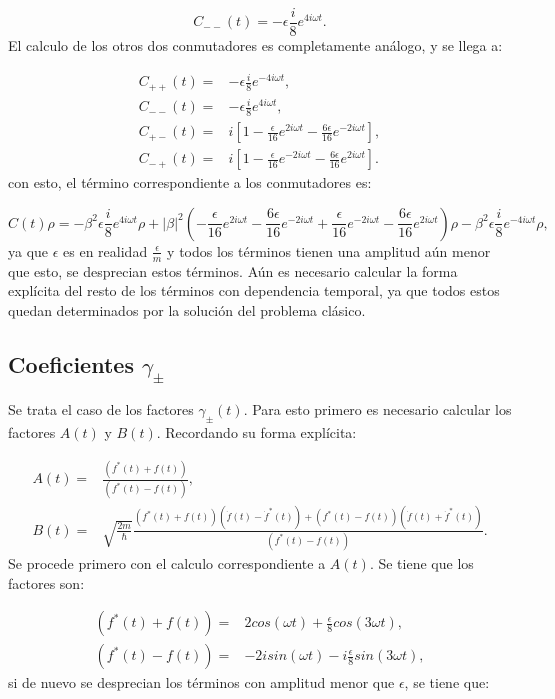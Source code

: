 \documentclass[a4paper,10pt]{report}
\begin{document}
\begin{equation*}
C_{--}(t) = -\epsilon\frac{i}{8}e^{4i\omega t}.
\end{equation*} El calculo de los otros dos conmutadores es completamente análogo, y se llega a:

\begin{align}
C_{++}(t) =& -\epsilon\frac{i}{8}e^{-4i\omega t},\\
C_{--}(t) =& -\epsilon\frac{i}{8}e^{4i\omega t},\\
C_{+-}(t) =& i [1 -\frac{\epsilon}{16}e^{2i\omega t}-\frac{6\epsilon}{16}e^{-2i\omega t}],\\
C_{-+}(t) =& i [1 -\frac{\epsilon}{16}e^{-2i\omega t}-\frac{6\epsilon}{16}e^{2i\omega t}].
\end{align} con esto, el término correspondiente a los conmutadores es:

\begin{equation}
C(t)\rho=-\beta^2\epsilon\frac{i}{8}e^{4i\omega t}\rho + |\beta|^2(-\frac{\epsilon}{16}e^{2i\omega t}-\frac{6\epsilon}{16}e^{-2i\omega t} + \frac{\epsilon}{16}e^{-2i\omega t}-\frac{6\epsilon}{16}e^{2i\omega t})\rho -\beta^2\epsilon\frac{i}{8}e^{-4i\omega t}\rho,
\end{equation} ya que $\epsilon$ es en realidad $\frac{\epsilon}{m}$ y todos los términos tienen una amplitud aún menor que esto, se desprecian estos términos. Aún es necesario calcular la forma explícita del resto de los términos con dependencia temporal, ya que todos estos quedan determinados por la solución del problema clásico.

\subsection{Coeficientes $\gamma_\pm$}

Se trata el caso de los factores $\gamma_{\pm}(t)$. Para esto primero es necesario calcular los factores $A(t)$ y $B(t)$. Recordando su forma explícita:

\begin{align}
A(t) =& \frac{(f^* (t) + f(t))}{(f^* (t) - f(t))}, \\
B(t) =& \sqrt{\frac{2m}{\hbar}}\frac{(f^* (t) + f(t))(\dot{f}(t) - \dot{f}^*(t))+(f^* (t) - f(t))(\dot{f}(t) + \dot{f}^* (t))}{(f^* (t) - f(t))}.
\end{align} Se procede primero con el calculo correspondiente a $A(t)$. Se tiene que los factores son:

\begin{align*}
(f^* (t) + f(t)) =& 2cos(\omega t) +\frac{\epsilon}{8}cos(3\omega t), \\
(f^* (t) - f(t)) =& -2isin(\omega t) -i\frac{\epsilon}{8}sin(3\omega t),
\end{align*} si de nuevo se desprecian los términos con amplitud menor que $\epsilon$, se tiene que:
\end{document}
